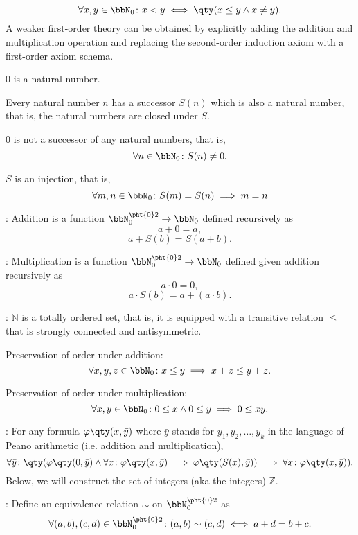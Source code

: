 \documentclass[a4paper,12pt]{report}
\begin{document}
\[\forall x,y\in\bbN_0\colon x<y\iff\qty(x\leq y\land x\neq y).\]
\eit
{}
A weaker first-order theory can be obtained by explicitly adding the addition and multiplication operation and replacing the second-order induction axiom with a first-order axiom schema.
\bit
\item $0$ is a natural number.
\item Every natural number $n$ has a successor $S(n)$ which is also a natural number, that is, the natural numbers are closed under $S$.
\item $0$ is not a successor of any natural numbers, that is,
\[\forall n\in\bbN_0\colon S(n)\neq 0.\]
\item $S$ is an injection, that is,
\[\forall m,n\in\bbN_0\colon S(m)=S(n)\implies m=n\]
\item {}: Addition is a function $\bbN_0^{\pht{0}2}\to\bbN_0$ defined recursively as
\[a+0=a,\]
\[a+S(b)=S(a+b).\]
\item {}: Multiplication is a function $\bbN_0^{\pht{0}2}\to\bbN_0$ defined given addition recursively as
\[a\cdot 0=0,\]
\[a\cdot S(b)=a+(a\cdot b).\]
\item {}: $\mathbb{N}$ is a totally ordered set, that is, it is equipped with a transitive relation $\leq$ that is strongly connected and antisymmetric.
\bit
\item Preservation of order under addition:
\[\forall x,y,z\in\bbN_0\colon x\leq y\implies x+z\leq y+z.\]
\item Preservation of order under multiplication:
\[\forall x,y\in\bbN_0\colon 0\leq x\land 0\leq y\implies 0\leq xy.\]
\eit
\item {}: For any formula $\varphi\qty(x,\bar{y})$ where $\bar{y}$ stands for $y_1,y_2,\ldots,y_k$ in the language of Peano arithmetic (i.e. addition and multiplication),
\[\forall\bar{y}\colon\qty(\varphi\qty(0,\bar{y})\land\forall x\colon\varphi\qty(x,\bar{y})\implies\varphi\qty(S(x),\bar{y}))\implies\forall x\colon\varphi\qty(x,\bar{y})).\]
\eit
{}
Below, we will construct the set of integers (aka the integers) $\mathbb{Z}$.
\bit
\item {}: Define an equivalence relation $\sim$ on $\bbN_0^{\pht{0}2}$ as
\[\forall(a,b),(c,d)\in\bbN_0^{\pht{0}2}\colon(a,b)\sim(c,d)\iff a+d=b+c.\]
\end{document}
